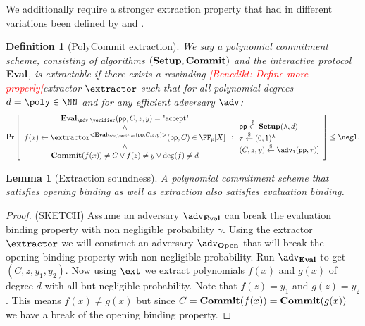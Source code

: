 \documentclass{article}
\newtheorem{definition}{Definition}
\newtheorem{lemma}{Lemma}
\newcommand{\benedikt}[1]{{\textcolor{red}{[Benedikt: #1]}}}
\newcommand{\benedikt}[1]{}
\begin{document}
We additionally require a stronger extraction property that had in different variations been defined by \cite{SP:ZGKPP17} and \cite{EPRINT:MBKM19}.
\begin{definition}[PolyCommit extraction]
We say a polynomial commitment scheme, consisting of algorithms $(\textbf{{Setup}},\textbf{{Commit}})$ and the interactive protocol $\textbf{{Eval}}$, is extractable if there exists a rewinding \benedikt{Define more properly}extractor $\extractor$ such that for all polynomial degrees $d=\poly\in \NN$ and for any efficient adversary $\adv$:
	\[        
                \Pr\left[\begin{array}{c}\eval_{\adv,\verifier}(\crs,C,z,y)=\text{"accept"}\\
                \wedge\\
                f(x)\gets\extractor^{<\eval_{\adv,\verifier}(\crs,C,z,y)>}(\crs,C)\in \FF_p[X]\\
                \wedge\\
               \commit(f(x))\neq C\vee f(z)\neq y \vee \deg(f)\neq d
                 \end{array}  : 
                \begin{array}{l} 
                      \crs \sample \setup(\lambda, d) \\
                      \tau \sample (0,1)^\lambda\\
                      (C,z,y)\sample \adv_1(\crs,\tau)]
                      
                \end{array} 
        \right] \leq \negl.
\]
\end{definition}
\begin{lemma}[Extraction soundness]
	A polynomial commitment scheme that satisfies opening binding as well as extraction also satisfies evaluation binding.
\end{lemma}
\begin{proof}
	(SKETCH) Assume an adversary $\adv_{\eval}$ can break the evaluation binding property with non negligible probability $\gamma$. Using the extractor $\extractor$ we will construct an adversary $\adv_\open$ that will break the opening binding property with non-negligible probability. Run $\adv_\eval$ to get $(C,z,y_1,y_2)$. Now using $\ext$ we extract polynomials $f(x)$ and $g(x)$ of degree $d$ with all but negligible probability. Note that $f(z)=y_1$ and $g(z)=y_2$. This means $f(x)\neq g(x)$ but since $C=\textbf{{Commit}}(f(x))=\textbf{{Commit}}(g(x))$ we have a break of the opening binding property.
\end{proof}
\end{document}
